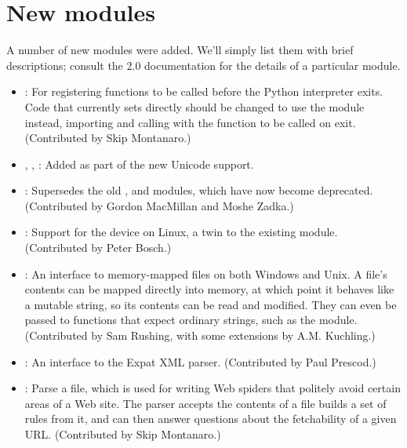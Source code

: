\documentclass{howto}
\begin{document}
\section{New modules}

A number of new modules were added.  We'll simply list them with brief
descriptions; consult the 2.0 documentation for the details of a
particular module.

\begin{itemize}

\item{}: 
For registering functions to be called before the Python interpreter exits.
Code that currently sets
 directly should be changed to 
use the  module instead, importing 
and calling  with 
the function to be called on exit.
(Contributed by Skip Montanaro.)

\item{, , :}  Added as part of the new Unicode support. 

\item{:} Supersedes the old ,  and
 modules, which have now become deprecated.
(Contributed by Gordon MacMillan and Moshe Zadka.)

\item{:} Support for the 
device on Linux, a twin to the existing  module.
(Contributed by Peter Bosch.)

\item{:} An interface to memory-mapped files on both
Windows and Unix.  A file's contents can be mapped directly into
memory, at which point it behaves like a mutable string, so its
contents can be read and modified.  They can even be passed to
functions that expect ordinary strings, such as the 
module. (Contributed by Sam Rushing, with some extensions by
A.M. Kuchling.)

\item{:} An interface to the Expat XML parser.
(Contributed by Paul Prescod.)

\item{:} Parse a  file, which is
used for writing Web spiders that politely avoid certain areas of a
Web site.  The parser accepts the contents of a  file
builds a set of rules from it, and can then answer questions about
the fetchability of a given URL.  (Contributed by Skip Montanaro.)


\end{itemize}
\end{document}
